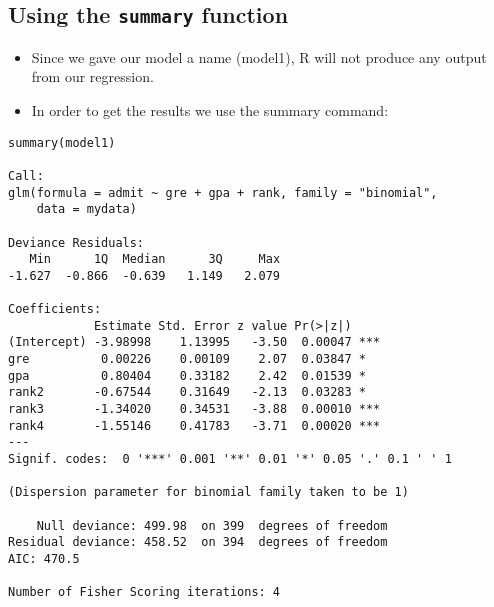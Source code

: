 \documentclass[]{article}
\begin{document}
\subsection{Using the \texttt{summary} function}
\begin{itemize}
\item Since we gave our model a name (model1), R will not produce any output from our regression. 
\item In order to get the results we use the summary command:
\end{itemize}
\begin{framed}
\begin{verbatim}
summary(model1)

Call:
glm(formula = admit ~ gre + gpa + rank, family = "binomial", 
    data = mydata)

Deviance Residuals: 
   Min      1Q  Median      3Q     Max  
-1.627  -0.866  -0.639   1.149   2.079  

Coefficients:
            Estimate Std. Error z value Pr(>|z|)    
(Intercept) -3.98998    1.13995   -3.50  0.00047 ***
gre          0.00226    0.00109    2.07  0.03847 *  
gpa          0.80404    0.33182    2.42  0.01539 *  
rank2       -0.67544    0.31649   -2.13  0.03283 *  
rank3       -1.34020    0.34531   -3.88  0.00010 ***
rank4       -1.55146    0.41783   -3.71  0.00020 ***
---
Signif. codes:  0 '***' 0.001 '**' 0.01 '*' 0.05 '.' 0.1 ' ' 1

(Dispersion parameter for binomial family taken to be 1)

    Null deviance: 499.98  on 399  degrees of freedom
Residual deviance: 458.52  on 394  degrees of freedom
AIC: 470.5

Number of Fisher Scoring iterations: 4
\end{verbatim}
\end{framed}
\end{document}
